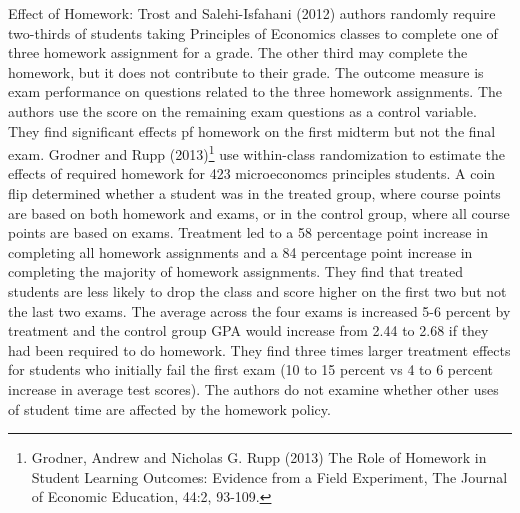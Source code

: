 \documentclass[12pt]{article}
\begin{document}
Effect of Homework:  Trost and Salehi-Isfahani (2012) authors randomly require two-thirds of students taking Principles of Economics classes to complete one of three homework assignment for a grade.  The other third may complete the homework, but it does not contribute to their grade.  The outcome measure is exam performance on questions related to the three homework assignments.  The authors use the score on the remaining exam questions as a control variable. They find significant effects pf homework on the first midterm but not the final exam. Grodner and Rupp (2013)\footnote{Grodner, Andrew and Nicholas G. Rupp (2013) The Role of Homework in Student Learning Outcomes: Evidence from a Field Experiment, The Journal of Economic Education, 44:2, 93-109.} use within-class randomization to estimate the effects of required homework for 423 microeconomcs principles students.  A coin flip determined whether a student was in the treated group, where course points are based on both homework and exams, or in the control group, where all course points are based on exams.  Treatment led to a 58 percentage point increase in completing all homework assignments and a 84 percentage point increase in completing the majority of homework assignments. They find that treated students are less likely to drop the class and score higher on the first two but not the last two exams.  The average across the four exams is increased 5-6 percent by treatment and the control group GPA would increase from 2.44 to 2.68 if they had been required to do homework.  They find three times larger treatment effects for students who initially fail the first exam (10 to 15 percent vs 4 to 6 percent increase in average test scores).  The authors do not examine whether other uses of student time are affected by the homework policy.  
\end{document}
